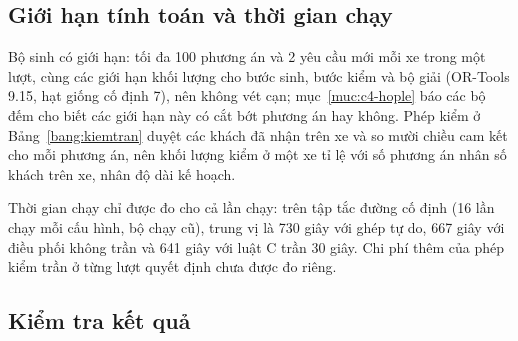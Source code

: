 \subsection{Giới hạn tính toán và thời gian chạy}
\label{muc:gioihan}

Bộ sinh có giới hạn: tối đa 100 phương án và 2 yêu cầu mới mỗi xe trong một lượt, cùng các giới hạn khối
lượng cho bước sinh, bước kiểm và bộ giải (OR-Tools 9.15, hạt giống cố định 7), nên không vét cạn;
mục~\ref{muc:c4-hople} báo các bộ đếm cho biết các giới hạn này có cắt bớt phương án hay không. Phép kiểm
ở Bảng~\ref{bang:kiemtran} duyệt các khách đã nhận trên xe và so mười chiều cam kết cho mỗi phương án, nên
khối lượng kiểm ở một xe tỉ lệ với số phương án nhân số khách trên xe, nhân độ dài kế hoạch.

Thời gian chạy chỉ được đo cho cả lần chạy: trên tập tắc đường cố định (16 lần chạy mỗi cấu hình, bộ chạy
cũ), trung vị là 730 giây với ghép tự do, 667 giây với điều phối không trần và 641 giây với luật C trần
30 giây. Chi phí thêm của phép kiểm trần ở từng lượt quyết định chưa được đo riêng.

\subsection{Kiểm tra kết quả}
\label{muc:kiemtra}

